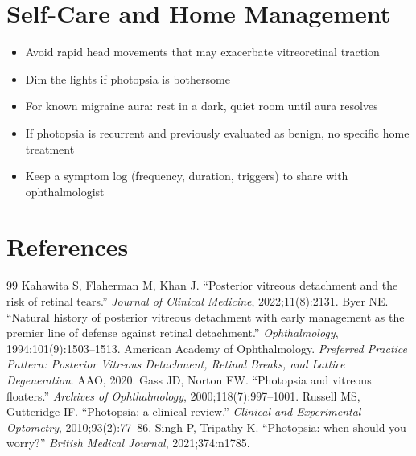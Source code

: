 \section*{Self-Care and Home Management}
\begin{itemize}
  \item Avoid rapid head movements that may exacerbate vitreoretinal traction
  \item Dim the lights if photopsia is bothersome
  \item For known migraine aura: rest in a dark, quiet room until aura resolves
  \item If photopsia is recurrent and previously evaluated as benign, no specific home treatment
  \item Keep a symptom log (frequency, duration, triggers) to share with ophthalmologist
\end{itemize}

\section*{References}
\begin{thebibliography}{99}
 Kahawita S, Flaherman M, Khan J. ``Posterior vitreous detachment and the risk of retinal tears.'' \textit{Journal of Clinical Medicine}, 2022;11(8):2131.
 Byer NE. ``Natural history of posterior vitreous detachment with early management as the premier line of defense against retinal detachment.'' \textit{Ophthalmology}, 1994;101(9):1503--1513.
 American Academy of Ophthalmology. \textit{Preferred Practice Pattern: Posterior Vitreous Detachment, Retinal Breaks, and Lattice Degeneration}. AAO, 2020.
 Gass JD, Norton EW. ``Photopsia and vitreous floaters.'' \textit{Archives of Ophthalmology}, 2000;118(7):997--1001.
 Russell MS, Gutteridge IF. ``Photopsia: a clinical review.'' \textit{Clinical and Experimental Optometry}, 2010;93(2):77--86.
 Singh P, Tripathy K. ``Photopsia: when should you worry?'' \textit{British Medical Journal}, 2021;374:n1785.

\end{thebibliography}
